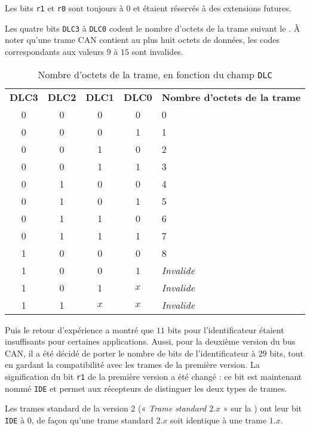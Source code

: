 Les bits \texttt{r1} et \texttt{r0} sont toujours à $0$ et étaient réservés à des extensions futures.

Les quatre bits \texttt{DLC3} à \texttt{DLC0} codent le nombre d'octets de la trame suivant le . À noter qu'une trame CAN contient au plus huit octets de données, les codes correspondants aux valeurs $9$ à $15$ sont invalides.

\begin{table}[!t]
  \small
  \centering
  \begin{tabular}{ccccl}
    \textbf{DLC3}& \textbf{DLC2} & \textbf{DLC1} & \textbf{DLC0}  & \textbf{Nombre d'octets de la trame} \\
     0 & 0 & 0 & 0 & 0 \\
     0 & 0 & 0 & 1 & 1 \\
     0 & 0 & 1 & 0 & 2 \\
     0 & 0 & 1 & 1 & 3 \\
     0 & 1 & 0 & 0 & 4 \\
     0 & 1 & 0 & 1 & 5 \\
     0 & 1 & 1 & 0 & 6 \\
     0 & 1 & 1 & 1 & 7 \\
     1 & 0 & 0 & 0 & 8 \\
     1 & 0 & 0 & 1 & \emph{Invalide} \\
     1 & 0 & 1 & $x$ & \emph{Invalide} \\
     1 & 1 & $x$ & $x$ & \emph{Invalide} \\
   \end{tabular}
  \caption{Nombre d'octets de la trame, en fonction du champ \texttt{DLC}}
  \ligne
\end{table}

Puis le retour d'expérience a montré que $11$ bits pour l'identificateur étaient insuffisants pour certaines applications. Aussi, pour la deuxième version du bus CAN, il a été décidé de porter le nombre de bits de l'identificateur à $29$ bits, tout en gardant la compatibilité avec les trames de la première version. La signification du bit \texttt{r1} de la première version a été changé : ce bit est maintenant nommé \texttt{IDE} et permet aux récepteurs de distinguer les deux types de trames.

Les trames standard de la version 2 (« \emph{Trame standard $2.x$} » sur la ) ont leur bit \texttt{IDE} à $0$, de façon qu'une trame standard $2.x$ soit identique à une trame $1.x$.

